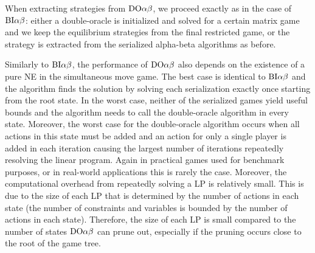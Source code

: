 When extracting strategies from $\textrm{DO}\alpha\beta$, we proceed exactly as in the case of $\textrm{BI}\alpha\beta$: either a double-oracle is initialized and solved for a certain matrix game and we keep the equilibrium strategies from the final restricted game, or the strategy is extracted from the serialized alpha-beta algorithms as before.

Similarly to $\textrm{BI}\alpha\beta$, the performance of $\textrm{DO}\alpha\beta$ also depends on the existence of a pure NE in the simultaneous move game.
The best case is identical to $\textrm{BI}\alpha\beta$ and the algorithm finds the solution by solving each serialization exactly once starting from the root state.
In the worst case, neither of the serialized games yield useful bounds and the algorithm needs to call the double-oracle algorithm in every state.
Moreover, the worst case for the double-oracle algorithm occurs when all actions in this state must be added and an action for only a single player is added in each iteration causing the largest number of iterations repeatedly resolving the linear program.
Again in practical games used for benchmark purposes, or in real-world applications this is rarely the case.
Moreover, the computational overhead from repeatedly solving a LP is relatively small. 
This is due to the size of each LP that is determined by the number of actions in each state (the number of constraints and variables is bounded by the number of actions in each state).
Therefore, the size of each LP is small compared to the number of states $\textrm{DO}\alpha\beta$ can prune out, especially if the pruning occurs close to the root of the game tree.


